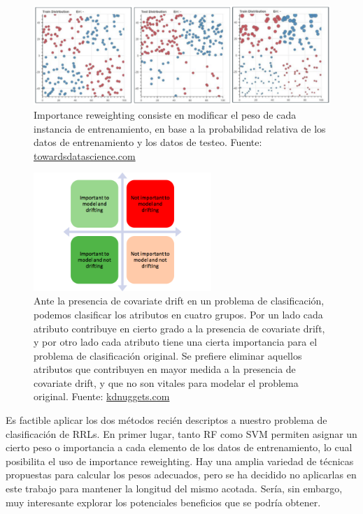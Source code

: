 \begin{figure}[h!]
\centering
  \includegraphics[width=\textwidth]{Kap8/reweighting.png}  
\caption{Importance reweighting consiste en modificar el peso de cada instancia de entrenamiento, en base a la probabilidad relativa de los datos de entrenamiento y los datos de testeo. Fuente: \url{towardsdatascience.com}}
\label{fig:histogram_intersection}
\end{figure}

\begin{figure}[h!]
\centering
  \includegraphics[width=0.6\textwidth]{Kap8/discriminative_removal.png}  
\caption{Ante la presencia de covariate drift en un problema de clasificación, podemos clasificar los atributos en cuatro grupos. Por un lado cada atributo contribuye en cierto grado a la presencia de covariate drift, y por otro lado cada atributo tiene una cierta importancia para el problema de clasificación original. Se prefiere eliminar aquellos atributos que contribuyen en mayor medida a la presencia de covariate drift, y que no son vitales para modelar el problema original. Fuente: \url{kdnuggets.com}}
\label{fig:discriminative_removal}
\end{figure}

Es factible aplicar los dos métodos recién descriptos a nuestro problema de clasificación de RRLs. En primer lugar, tanto RF como SVM permiten asignar un cierto peso o importancia a cada elemento de los datos de entrenamiento, lo cual posibilita el uso de importance reweighting. Hay una amplia variedad de técnicas propuestas para calcular los pesos adecuados, pero se ha decidido no aplicarlas en este trabajo para mantener la longitud del mismo acotada. Sería, sin embargo, muy interesante explorar los potenciales beneficios que se podría obtener. \\

